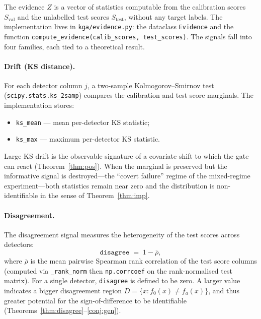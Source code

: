 The evidence $Z$ is a vector of statistics computable from the calibration
scores $S_\mathrm{val}$ and the unlabelled test scores $S_\mathrm{test}$,
without any target labels.  The implementation lives in
\texttt{kga/evidence.py}: the dataclass \texttt{Evidence} and the function
\texttt{compute\_evidence(calib\_scores, test\_scores)}.  The signals fall into
four families, each tied to a theoretical result.

\paragraph{Drift (KS distance).}
For each detector column $j$, a two-sample Kolmogorov--Smirnov test
(\texttt{scipy.stats.ks\_2samp}) compares the calibration and test score
marginals.  The implementation stores:
\begin{itemize}
  \item \texttt{ks\_mean} --- mean per-detector KS statistic;
  \item \texttt{ks\_max} --- maximum per-detector KS statistic.
\end{itemize}
Large KS drift is the observable signature of a covariate shift to which
the gate can react (Theorem~\ref{thm:pos}).  When the marginal is
preserved but the informative signal is destroyed---the ``covert failure''
regime of the mixed-regime experiment---both statistics remain near zero and
the distribution is non-identifiable in the sense of
Theorem~\ref{thm:imp}.

\paragraph{Disagreement.}
The disagreement signal measures the heterogeneity of the test scores
across detectors:
\begin{equation}
  \texttt{disagree} \;=\; 1 - \overline{\rho},
  \label{eq:kga-disagree}
\end{equation}
where $\overline{\rho}$ is the mean pairwise Spearman rank correlation of the
test score columns (computed via \texttt{\_rank\_norm} then \texttt{np.corrcoef}
on the rank-normalised test matrix).  For a single detector, \texttt{disagree}
is defined to be zero.  A larger value indicates a bigger disagreement region
$D = \{x : f_0(x) \neq f_a(x)\}$, and thus greater potential for the
sign-of-difference to be identifiable
(Theorems~\ref{thm:disagree}--\ref{conj:gen}).

